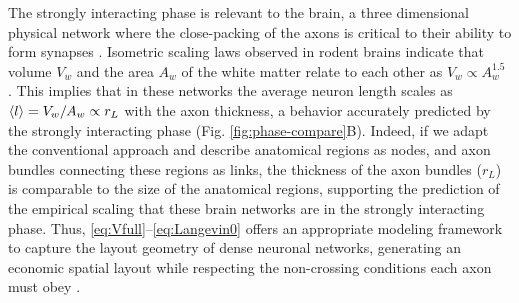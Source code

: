 \documentclass[endfloats,nofootinbib,preprint,floatfix,titlepage,superscriptaddress,linenumbers]{revtex4-1} %
\begin{document}
The strongly interacting phase is relevant to the brain, a three dimensional physical network where the close-packing of the axons is critical to their ability to form synapses \cite{stepanyants2002geometry,rivera2011wiring}. 
Isometric scaling laws observed in rodent brains \cite{ventura2013different} indicate that volume $V_w$ and the area $A_w$ of the white matter relate to each other as $V_w\propto A_w^{1.5}$ \cite{ventura2013different}. 
This implies that in these networks the average neuron length scales as $ \left<l\right> = V_w/A_w \propto r_L $ with the axon thickness, a behavior accurately predicted by the strongly interacting phase %
(Fig. \ref{fig:phase-compare}B). 
{ 
Indeed, if we adapt the conventional approach and describe anatomical regions as nodes, and axon bundles connecting these regions as links, 
the thickness of the axon bundles ($r_L$) is comparable to the size of the anatomical regions, supporting the prediction of the empirical scaling that these brain networks are  in the strongly interacting phase. 
Thus, \eqref{eq:Vfull}--\eqref{eq:Langevin0} offers an appropriate modeling framework to capture the layout geometry of dense neuronal networks, generating an economic spatial layout %
\cite{bullmore2012economy,sporns2004organization} while respecting the non-crossing conditions each axon must obey \cite{kasthuri12015saturated}.
}
\end{document}
